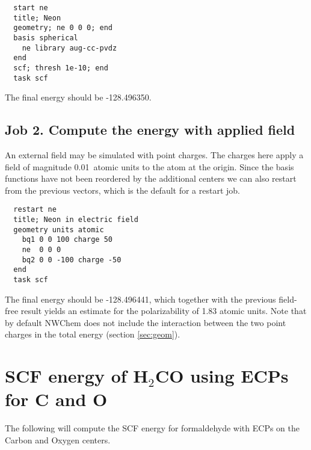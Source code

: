 \begin{verbatim}
  start ne
  title; Neon
  geometry; ne 0 0 0; end
  basis spherical 
    ne library aug-cc-pvdz
  end
  scf; thresh 1e-10; end
  task scf
\end{verbatim}

The final energy should be -128.496350.

\subsection{Job 2. Compute the energy with applied field}

An external field may be simulated with point charges.  The charges
here apply a field of magnitude 0.01\ atomic units to the atom at the
origin.  Since the basis functions have not been reordered by the
additional centers we can also restart from the previous vectors,
which is the default for a restart job.

\begin{verbatim}
  restart ne
  title; Neon in electric field
  geometry units atomic
    bq1 0 0 100 charge 50
    ne  0 0 0
    bq2 0 0 -100 charge -50
  end
  task scf
\end{verbatim}

The final energy should be -128.496441, which together with the
previous field-free result yields an estimate for the polarizability
of 1.83 atomic units.  Note that by default NWChem does not include
the interaction between the two point charges in the total energy
(section \ref{sec:geom}).

\section{SCF energy of H$_2$CO using ECPs for C and O}
\label{sec:sample3}

The following will compute the SCF energy for formaldehyde with ECPs
on the Carbon and Oxygen centers.

